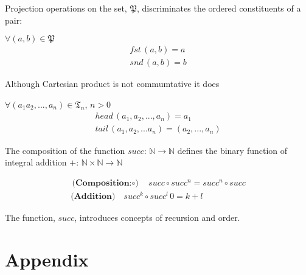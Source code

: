 \documentclass[aps,twocolumn,secnumarabic,nobalancelastpage,amsmath,amssymb,
amsthm,nofootinbib,parskip=full]{revtex4}
\numberwithin{equation}{section}
\begin{document}
Projection operations on the set,
$\mathfrak{P}$, discriminates the ordered constituents of a pair:

$\forall (a,b)\in\mathfrak{P}$
\begin{align}
  fst\,(a,b)=a\label{eq:fst}\\
  snd\,(a,b)=b\label{eq:snd}
\end{align}

Although Cartesian product is not commumtative it does

$\forall (a_1a_2,...,a_n)\in\mathfrak{T}_n$, $n>0$
\begin{align}
  head\,(a_1,a_2,...,a_n)=a_1\label{eq:head}\\
  tail\,(a_1,a_2,...a_n)=(a_2,...,a_n)\label{eq:tail}
\end{align}

The composition of the function $succ:\,\mathbb{N}\rightarrow\mathbb{N}$
defines the binary function of integral addition
$+:\,\mathbb{N}\times\mathbb{N}\rightarrow\mathbb{N}$

\begin{align}
  \textbf{(Composition:$\circ$)}\quad succ\circ succ^n=succ^n\circ succ\label{eq:comp}\\
  \textbf{(Addition)}\quad succ^k\circ succ^l\,0=k+l\label{eq:add}
\end{align}

The function,  $succ$, introduces concepts of recursion
and order.

\section{Appendix}


\end{document}
